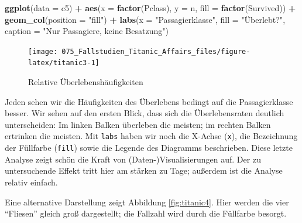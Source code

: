 \documentclass[12pt,ngerman,]{book}
\makeatletter
\newenvironment{Shaded}{\begin{snugshade}}{\end{snugshade}}
\newcommand{\KeywordTok}[1]{\textcolor[rgb]{0.13,0.29,0.53}{\textbf{#1}}}
\newcommand{\DataTypeTok}[1]{\textcolor[rgb]{0.13,0.29,0.53}{#1}}
\newcommand{\StringTok}[1]{\textcolor[rgb]{0.31,0.60,0.02}{#1}}
\newcommand{\OperatorTok}[1]{\textcolor[rgb]{0.81,0.36,0.00}{\textbf{#1}}}
\newcommand{\NormalTok}[1]{#1}
\newenvironment{kframe}{%
\medskip{}
\setlength{\fboxsep}{.8em}
 \def\at@end@of@kframe{}%
 \ifinner\ifhmode%
  \def\at@end@of@kframe{\end{minipage}}%
  \begin{minipage}{\columnwidth}%
 \fi\fi%
 \def\FrameCommand##1{\hskip\@totalleftmargin \hskip-\fboxsep
 \colorbox{shadecolor}{##1}\hskip-\fboxsep
     \hskip-\linewidth \hskip-\@totalleftmargin \hskip\columnwidth}%
 \MakeFramed {\advance\hsize-\width
   \@totalleftmargin\z@ \linewidth\hsize
   \@setminipage}}%
 {\par\unskip\endMakeFramed%
 \at@end@of@kframe}
\renewenvironment{Shaded}{\begin{kframe}}{\end{kframe}}
\theoremstyle{definition}
\theoremstyle{definition}
\theoremstyle{remark}
\makeatother
\begin{document}
\begin{Shaded}
\begin{Highlighting}[]
\KeywordTok{ggplot}\NormalTok{(}\DataTypeTok{data =}\NormalTok{ c5) }\OperatorTok{+}
\StringTok{  }\KeywordTok{aes}\NormalTok{(}\DataTypeTok{x =} \KeywordTok{factor}\NormalTok{(Pclass), }\DataTypeTok{y =}\NormalTok{ n, }\DataTypeTok{fill =} \KeywordTok{factor}\NormalTok{(Survived)) }\OperatorTok{+}\StringTok{ }
\StringTok{  }\KeywordTok{geom_col}\NormalTok{(}\DataTypeTok{position =} \StringTok{"fill"}\NormalTok{) }\OperatorTok{+}
\StringTok{  }\KeywordTok{labs}\NormalTok{(}\DataTypeTok{x =} \StringTok{"Passagierklasse"}\NormalTok{, }
       \DataTypeTok{fill =} \StringTok{"Überlebt?"}\NormalTok{, }
       \DataTypeTok{caption =} \StringTok{"Nur Passagiere, keine Besatzung"}\NormalTok{)}
\end{Highlighting}
\end{Shaded}

\begin{figure}

{\centering \texttt{[image: 075\_Fallstudien\_Titanic\_Affairs\_files/figure-latex/titanic3-1]} 

}

\caption{Relative Überlebenshäufigkeiten}\label{fig:titanic3}
\end{figure}

Jeden sehen wir die Häufigkeiten des Überlebens bedingt auf die
Passagierklasse besser. Wir sehen auf den ersten Blick, dass sich die
Überlebensraten deutlich unterscheiden: Im linken Balken überleben die
meisten; im rechten Balken ertrinken die meisten. Mit \texttt{labs}
haben wir noch die X-Achse (\texttt{x}), die Bezeichnung der Füllfarbe
(\texttt{fill}) sowie die Legende des Diagramms beschrieben. Diese
letzte Analyse zeigt schön die Kraft von (Daten-)Visualisierungen auf.
Der zu untersuchende Effekt tritt hier am stärken zu Tage; außerdem ist
die Analyse relativ einfach.

Eine alternative Darstellung zeigt Abbildung \ref{fig:titanic4}. Hier
werden die vier ``Fliesen'' gleich groß dargestellt; die Fallzahl wird
durch die Füllfarbe besorgt.

\begin{Shaded}
\end{Shaded}
\end{document}
